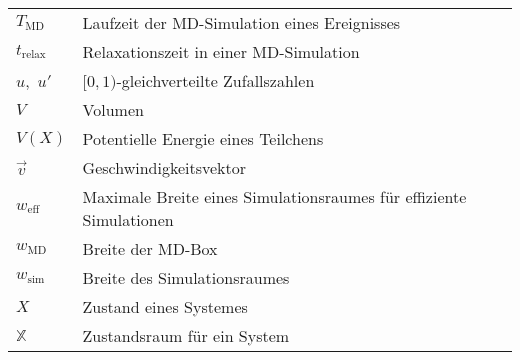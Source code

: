 {\begin{longtable}{ll}
$T_\text{MD}$        & Laufzeit der MD-Simulation eines Ereignisses                        \\
$t_\text{relax}$     & Relaxationszeit in einer MD-Simulation                              \\
$u$,~$u'$            & $[0,1)$-gleichverteilte Zufallszahlen                               \\
$V$                  & Volumen                                                             \\
$V(X)$               & Potentielle Energie eines Teilchens                                 \\
$\vec v$             & Geschwindigkeitsvektor                                              \\
$w_\text{eff}$       & Maximale Breite eines Simulationsraumes für effiziente Simulationen \\
$w_\text{MD}$        & Breite der MD-Box                                                   \\
$w_\text{sim}$       & Breite des Simulationsraumes                                        \\
$X$                  & Zustand eines Systemes                                              \\
$\mathbb{X}$         & Zustandsraum für ein System                                         \\
\end{longtable}
}
